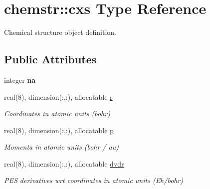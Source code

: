 \hypertarget{structchemstr_1_1cxs}{}\section{chemstr\+:\+:cxs Type Reference}
\label{structchemstr_1_1cxs}


Chemical structure object definition.  


\subsection*{Public Attributes}
\begin{DoxyCompactItemize}
\item 
\mbox{\label{structchemstr_1_1cxs_a05ebdcf9b7c9f153a1bd51f516d7552b}} 
integer {\bfseries na}
\item 
\mbox{\label{structchemstr_1_1cxs_a6813e5fe80447941e745841d45c66890}} 
real(8), dimension(\+:,\+:), allocatable \mbox{\hyperlink{structchemstr_1_1cxs_a6813e5fe80447941e745841d45c66890}{r}}
\begin{DoxyCompactList}\small\item\em Coordinates in atomic units (bohr) \end{DoxyCompactList}\item 
\mbox{\label{structchemstr_1_1cxs_acc5a3222a1e76386bbe5ac9a1e48eb70}} 
real(8), dimension(\+:,\+:), allocatable \mbox{\hyperlink{structchemstr_1_1cxs_acc5a3222a1e76386bbe5ac9a1e48eb70}{p}}
\begin{DoxyCompactList}\small\item\em Momenta in atomic units (bohr / au) \end{DoxyCompactList}\item 
\mbox{\label{structchemstr_1_1cxs_a67880ffd7287ab6906d09f9e6e0f5f63}} 
real(8), dimension(\+:,\+:), allocatable \mbox{\hyperlink{structchemstr_1_1cxs_a67880ffd7287ab6906d09f9e6e0f5f63}{dvdr}}
\begin{DoxyCompactList}\small\item\em P\+ES derivatives wrt coordinates in atomic units (Eh/bohr) \end{DoxyCompactList}\item 
\mbox{\label{structchemstr_1_1cxs_a05728bee6f7eb6e96b055e20ed6e6269}} 

\end{DoxyCompactItemize}
